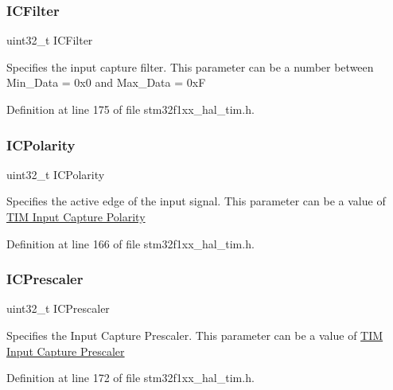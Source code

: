 \subsubsection{\texorpdfstring{I\+C\+Filter}{ICFilter}}
{\footnotesize\ttfamily uint32\+\_\+t I\+C\+Filter}

Specifies the input capture filter. This parameter can be a number between Min\+\_\+\+Data = 0x0 and Max\+\_\+\+Data = 0xF 

Definition at line 175 of file stm32f1xx\+\_\+hal\+\_\+tim.\+h.

\mbox{\label{struct_t_i_m___i_c___init_type_def_a6c0364c24e89f17849b0109236112fba}} 
\subsubsection{\texorpdfstring{I\+C\+Polarity}{ICPolarity}}
{\footnotesize\ttfamily uint32\+\_\+t I\+C\+Polarity}

Specifies the active edge of the input signal. This parameter can be a value of \hyperlink{group___t_i_m___input___capture___polarity}{T\+IM Input Capture Polarity} 

Definition at line 166 of file stm32f1xx\+\_\+hal\+\_\+tim.\+h.

\mbox{\label{struct_t_i_m___i_c___init_type_def_adc795cd98eeaa7725743856652cd2b4a}} 
\subsubsection{\texorpdfstring{I\+C\+Prescaler}{ICPrescaler}}
{\footnotesize\ttfamily uint32\+\_\+t I\+C\+Prescaler}

Specifies the Input Capture Prescaler. This parameter can be a value of \hyperlink{group___t_i_m___input___capture___prescaler}{T\+IM Input Capture Prescaler} 

Definition at line 172 of file stm32f1xx\+\_\+hal\+\_\+tim.\+h.

